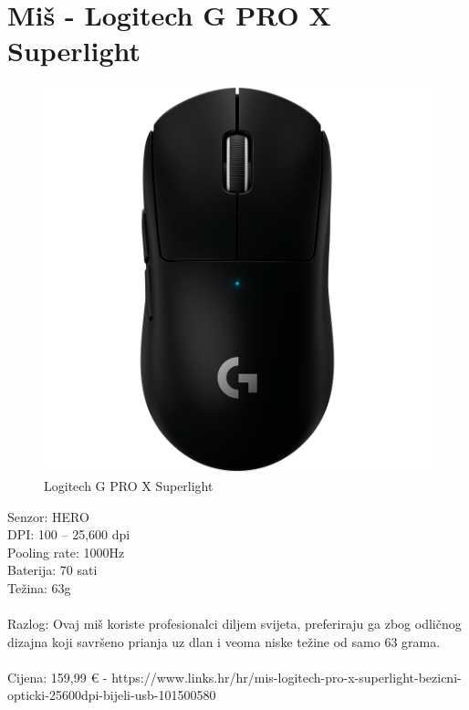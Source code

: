 \documentclass{report}
\begin{document}
\section{Miš - Logitech G PRO X Superlight}
\begin{figure}[H]
    \centering
    \includegraphics[scale=0.23]{miš.png}
    \caption{Logitech G PRO X Superlight}
    \label{fig:mis}
\end{figure}
Senzor: HERO\\DPI: 100 – 25,600 dpi\\Pooling rate: 1000Hz\\Baterija: 70 sati\\Težina: 63g\\\\Razlog: Ovaj miš koriste profesionalci diljem svijeta, preferiraju ga zbog odličnog dizajna koji savršeno prianja uz dlan i veoma niske težine od samo 63 grama.\\\\Cijena: 159,99 € - https://www.links.hr/hr/mis-logitech-pro-x-superlight-bezicni-opticki-25600dpi-bijeli-usb-101500580

\pagebreak
\end{document}
